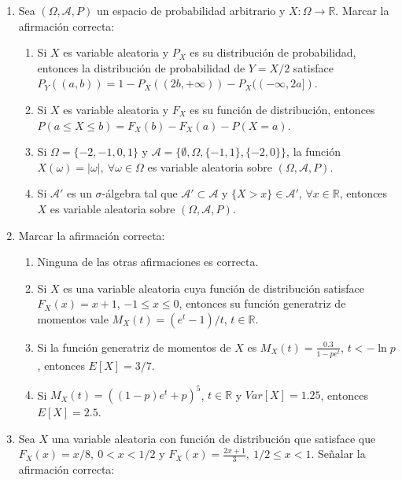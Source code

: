 \documentclass[fleqn]{article}
\begin{document}
\begin{enumerate}
  \item Sea $(\Omega, \mathcal{A}, P)$ un espacio de probabilidad arbitrario y $X : \Omega \to \mathbb{R}$. Marcar la afirmación correcta:

        \begin{enumerate}
          \item Si $X$ es variable aleatoria y $P_X$ es su distribución de probabilidad, entonces la distribución de probabilidad de $Y = X/2$ satisface $P_Y((a, b)) = 1 - P_X((2b, +\infty)) - P_X((-\infty, 2a])$.
          \item Si $X$ es variable aleatoria y $F_X$ es su función de distribución, entonces $P(a \le X \le b) = F_X(b) - F_X(a) - P(X = a)$.
          \item Si $\Omega = \{-2, -1, 0, 1\}$ y $\mathcal{A} = \{\emptyset, \Omega, \{-1, 1\}, \{-2, 0\}\}$, la función $X(\omega) = |\omega|,\ \forall\omega \in \Omega$ es variable aleatoria sobre $(\Omega, \mathcal{A}, P)$.
          \item Si $\mathcal{A}'$ es un $\sigma$-álgebra tal que $\mathcal{A}' \subset \mathcal{A}$ y $\{X > x\} \in \mathcal{A}'$, $\forall x \in \mathbb{R}$, entonces $X$ es variable aleatoria sobre $(\Omega, \mathcal{A}, P)$.
        \end{enumerate}

  \item Marcar la afirmación correcta:

        \begin{enumerate}
          \item Ninguna de las otras afirmaciones es correcta.
          \item Si $X$ es una variable aleatoria cuya función de distribución satisface $F_X(x) = x + 1$, $-1 \le x \le 0$, entonces su función generatriz de momentos vale $M_X(t) = (e^t - 1)/t$, $t \in \mathbb{R}$.
          \item Si la función generatriz de momentos de $X$ es $M_X(t) = \frac{0.3}{1 - pe^t}$, $t < -\ln{p}$, entonces $E[X] = 3/7$.
          \item Si $M_X(t) = ((1 - p)e^t + p)^5$, $t \in \mathbb{R}$ y $Var[X] = 1.25$, entonces $E[X] = 2.5$.
        \end{enumerate}

  \item Sea $X$ una variable aleatoria con función de distribución que satisface que $F_X(x) = x/8,\ 0 < x < 1/2$ y $F_X(x) = \frac{2x + 1}{3},\ 1/2 \le x < 1$. Señalar la afirmación correcta:


\end{enumerate}
\end{document}
